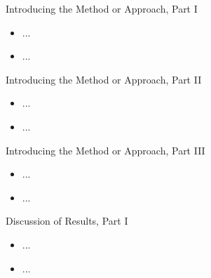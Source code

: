 \documentclass[12pt,t]{beamer}
\begin{document}
\begin{frame}[c]{Introducing the Method or Approach, Part I}

\begin{center}
\begin{itemize}
  \item ...
  \item ...
\end{itemize}
\end{center}


\end{frame}



\begin{frame}[c]{Introducing the Method or Approach, Part II}

\begin{center}
\begin{itemize}
  \item ...
  \item ...
\end{itemize}
\end{center}


\end{frame}



\begin{frame}[c]{Introducing the Method or Approach, Part III}

\begin{center}
\begin{itemize}
  \item ...
  \item ...
\end{itemize}
\end{center}


\end{frame}



\begin{frame}[c]{Discussion of Results, Part I}

\begin{center}
\begin{itemize}
  \item ...
  \item ...
\end{itemize}
\end{center}


\end{frame}
\end{document}
